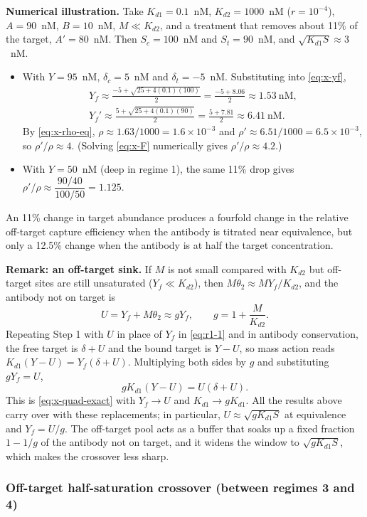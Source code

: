 \textbf{Numerical illustration.} Take $K_{d1}=0.1$~nM, $K_{d2}=1000$~nM
($r=10^{-4}$), $A=90$~nM, $B=10$~nM, $M\ll K_{d2}$, and a treatment that
removes about 11\% of the target, $A'=80$~nM. Then $S_c=100$~nM and
$S_t=90$~nM, and $\sqrt{K_{d1}S}\approx3$~nM.
\begin{itemize}
    \item With $Y=95$~nM, $\delta_c=5$~nM and $\delta_t=-5$~nM. Substituting
    into \eqref{eq:x-yf},
    $$
    \begin{gathered}
    Y_f\approx\frac{-5+\sqrt{25+4(0.1)(100)}}{2}=\frac{-5+8.06}{2}\approx1.53~\text{nM},\\
    Y_f'\approx\frac{5+\sqrt{25+4(0.1)(90)}}{2}=\frac{5+7.81}{2}\approx6.41~\text{nM}.
    \end{gathered}
    $$
    By \eqref{eq:x-rho-eq}, $\rho\approx1.63/1000=1.6\times10^{-3}$ and
    $\rho'\approx6.51/1000=6.5\times10^{-3}$, so $\rho'/\rho\approx4$.
    (Solving \eqref{eq:x-F} numerically gives $\rho'/\rho\approx4.2$.)
    \item With $Y=50$~nM (deep in regime 1), the same 11\% drop gives
    $\rho'/\rho\approx\dfrac{90/40}{100/50}=1.125$.
\end{itemize}
An 11\% change in target abundance produces a fourfold change in the
relative off-target capture efficiency when the antibody is titrated near
equivalence, but only a 12.5\% change when the antibody is at half the
target concentration.

\textbf{Remark: an off-target sink.} If $M$ is not small compared with
$K_{d2}$ but off-target sites are still unsaturated ($Y_f\ll K_{d2}$), then
$M\theta_2\approx MY_f/K_{d2}$, and the antibody not on target is
$$
U=Y_f+M\theta_2\approx gY_f,
\qquad
g=1+\frac{M}{K_{d2}}.
$$
Repeating Step 1 with $U$ in place of $Y_f$ in \eqref{eq:r1-1} and
in antibody conservation, the free target is $\delta+U$ and the bound target
is $Y-U$, so mass action reads $K_{d1}(Y-U)=Y_f(\delta+U)$. Multiplying both
sides by $g$ and substituting $gY_f=U$,
$$
gK_{d1}(Y-U)=U(\delta+U).
$$
This is \eqref{eq:x-quad-exact} with $Y_f\to U$ and $K_{d1}\to gK_{d1}$.
All the results above carry over with these replacements; in particular,
$U\approx\sqrt{gK_{d1}S}$ at equivalence and $Y_f=U/g$. The off-target pool
acts as a buffer that soaks up a fixed fraction $1-1/g$ of the antibody not
on target, and it widens the window to $\sqrt{gK_{d1}S}$, which makes the
crossover less sharp.

\subsubsection{Off-target half-saturation crossover (between regimes 3 and 4)}

